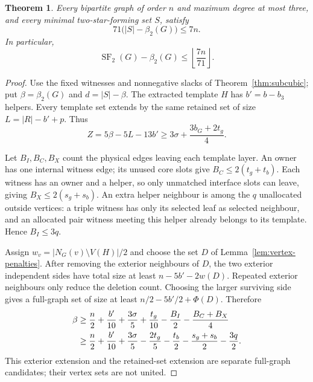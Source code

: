 \documentclass[11pt]{article}
\newtheorem{theorem}{Theorem}
\newcommand{\SF}{\operatorname{SF}_2}
\newcommand{\diss}{\beta_2}
\begin{document}
\begin{theorem}\label{thm:joint-subcubic}
Every bipartite graph of order $n$ and maximum degree at most three,
and every minimal two-star-forming set $S$, satisfy
\[
 71\bigl(|S|-\diss(G)\bigr)\le7n.
\]
In particular,
\[
 \boxed{\SF(G)-\diss(G)\le\left\lfloor\frac{7n}{71}\right\rfloor.}
\]
\end{theorem}
\begin{proof}
Use the fixed witnesses and nonnegative slacks of
Theorem~\ref{thm:subcubic}; put $\beta=\diss(G)$ and $d=|S|-\beta$.
The extracted template $H$ has $b'=b-b_3$ helpers. Every template set
extends by the same retained set of size $L=|R|-b'+p$. Thus
\begin{equation}\label{eq:joint-Z}
 Z=5\beta-5L-13b'\ge3\sigma+\frac{3b_G+2t_g}{4}.
\end{equation}

Let $B_I,B_C,B_X$ count the physical edges leaving each template layer.
An owner has one internal witness edge; its unused core slots give
$B_C\le2(t_g+t_b)$. Each witness has an owner and a helper, so only
unmatched interface slots can leave, giving $B_X\le2(s_g+s_b)$.
An extra helper neighbour is among the $q$ unallocated outside vertices:
a triple witness has only its selected leaf as selected neighbour,
and an allocated pair witness meeting this helper already belongs to
its template. Hence $B_I\le3q$.

Assign $w_v=|N_G(v)\setminus V(H)|/2$ and choose the set $D$ of
Lemma~\ref{lem:vertex-penalties}. After removing the exterior neighbours
of $D$, the two exterior independent sides have total size at least
$n-5b'-2w(D)$. Repeated exterior neighbours only reduce the deletion count.
Choosing the larger surviving side gives a full-graph set of size at least
$n/2-5b'/2+\Phi(D)$. Therefore
\begin{align}
 \beta&\ge\frac n2+\frac{b'}{10}+\frac{3\sigma}{5}+\frac{t_g}{10}
              -\frac{B_I}{2}-\frac{B_C+B_X}{4}\notag\\
 &\ge\frac n2+\frac{b'}{10}+\frac{3\sigma}{5}
              -\frac{2t_g}{5}-\frac{t_b}{2}
              -\frac{s_g+s_b}{2}-\frac{3q}{2}.
 \label{eq:joint-exterior}
\end{align}
This exterior extension and the retained-set extension are separate
full-graph candidates; their vertex sets are not united.


\end{proof}
\end{document}

